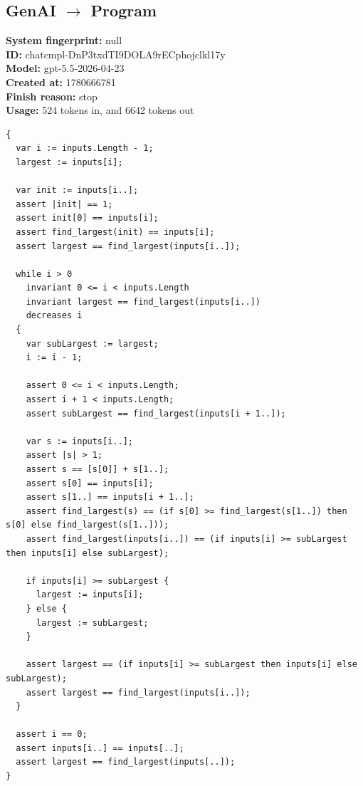 \documentclass{article}
\begin{document}
\subsection*{GenAI $\rightarrow$ Program}
\textbf{System fingerprint: }null
\\\textbf{ID: }chatcmpl-DnP3txdTI9DOLA9rECphojclkl17y
\\\textbf{Model: }gpt-5.5-2026-04-23
\\\textbf{Created at: }1780666781
\\\textbf{Finish reason: }stop
\\\textbf{Usage: }524 tokens in, and 6642 tokens out
\begin{lstlisting}
{
  var i := inputs.Length - 1;
  largest := inputs[i];

  var init := inputs[i..];
  assert |init| == 1;
  assert init[0] == inputs[i];
  assert find_largest(init) == inputs[i];
  assert largest == find_largest(inputs[i..]);

  while i > 0
    invariant 0 <= i < inputs.Length
    invariant largest == find_largest(inputs[i..])
    decreases i
  {
    var subLargest := largest;
    i := i - 1;

    assert 0 <= i < inputs.Length;
    assert i + 1 < inputs.Length;
    assert subLargest == find_largest(inputs[i + 1..]);

    var s := inputs[i..];
    assert |s| > 1;
    assert s == [s[0]] + s[1..];
    assert s[0] == inputs[i];
    assert s[1..] == inputs[i + 1..];
    assert find_largest(s) == (if s[0] >= find_largest(s[1..]) then s[0] else find_largest(s[1..]));
    assert find_largest(inputs[i..]) == (if inputs[i] >= subLargest then inputs[i] else subLargest);

    if inputs[i] >= subLargest {
      largest := inputs[i];
    } else {
      largest := subLargest;
    }

    assert largest == (if inputs[i] >= subLargest then inputs[i] else subLargest);
    assert largest == find_largest(inputs[i..]);
  }

  assert i == 0;
  assert inputs[i..] == inputs[..];
  assert largest == find_largest(inputs[..]);
}
\end{lstlisting}
\end{document}
